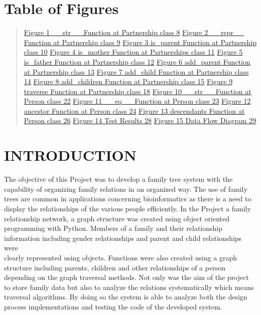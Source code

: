 \documentclass[
]{article}
\begin{document}
\section{Table of Figures}\label{table-of-figures} \begin{quote}
\hyperref[figure-1-__str__-function-at-partnership-class]{Figure 1
\_\_str\_\_ Function at Partnership class 8} \hyperref[figure-2-__repr__-function-at-partnership-class]{Figure 2
\_\_repr\_\_ Function at Partnership class 9} \hyperref[figure-3-is_parent-function-at-partnership-class]{Figure 3
is\_parent Function at Partnership class 10} \hyperref[figure-4-is_mother-function-at-partnerships-class]{Figure 4
is\_mother Function at Partnerships class 11} \hyperref[figure-5-is_father-function-at-partnership-class]{Figure 5
is\_father Function at Partnership class 12} \hyperref[figure-6-add_parent-function-at-partnership-class]{Figure 6
add\_parent Function at Partnership class 13} \hyperref[figure-7-add_child-function-at-partnership-class]{Figure 7
add\_child Function at Partnership class 14} \hyperref[figure-8-add_children-function-at-partnership-class]{Figure 8
add\_children Function at Partnership class 15} \hyperref[figure-9-traverse-function-at-partnership-class]{Figure 9
traverse Function at Partnership class 18} \hyperref[figure-10-__str__-function-at-person-class]{Figure 10
\_\_str\_\_ Function at Person class 22} \hyperref[figure-11-__eq__-function-at-person-class]{Figure 11
\_\_eq\_\_ Function at Person class 23} \hyperref[figure-12-ancestor-function-at-person-class]{Figure 12
ancestor Function at Person class 24} \hyperref[figure-13-descendants-function-at-person-class]{Figure 13
descendants Function at Person class 26} \hyperref[figure-14-test-results]{Figure 14 Test Results 28} \hyperref[figure-15-data-flow-diagram]{Figure 15 Data Flow Diagram 29}
\end{quote} \newpage %
\section{INTRODUCTION}\label{introduction} The objective of this Project was to develop a family tree system with
the capability of organizing family relations in an organized way. The
use of family trees are common in applications concerning bioinformatics
as there is a need to display the relationships of the various people
efficiently. In the Project a family relationship network, a graph structure was
created using object oriented programming with Python. Members of a
family and their relationship\\
information including gender relationships and parent and child
relationships were\\
clearly represented using objects. Functions were also created using a
graph structure including parents, children and other relationships of a
person depending on the graph traversal methods. Not only was the aim of the project to store family data but also to
analyze the relations systematically which means traversal algorithms.
By doing so the system is able to analyze both the design process
implementations and testing the code of the developed system. \newpage %
\end{document}
